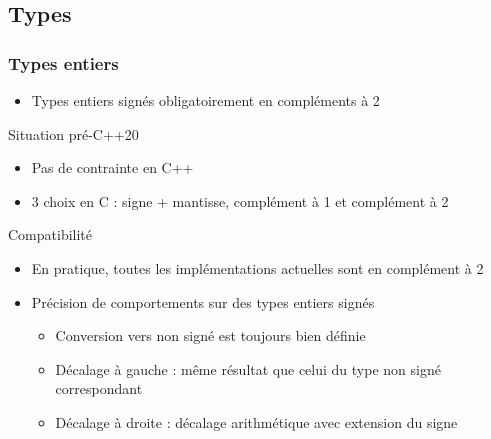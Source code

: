 \documentclass[C++.tex]{subfiles}
\begin{document}
\subsection*{Types}
\begin{frame}[fragile]
	\frametitle{Types entiers}
	\begin{itemize}
		\item Types entiers signés obligatoirement en compléments à 2
	\end{itemize}

	\begin{block}{Situation pré-C++20}
		\begin{itemize}
			\item Pas de contrainte en C++
			\item 3 choix en C : signe + mantisse, complément à 1 et complément à 2
		\end{itemize}
	\end{block}


	\begin{alertblock}{Compatibilité}
		\begin{itemize}
			\item En pratique, toutes les implémentations actuelles sont en complément à 2
		\end{itemize}
	\end{alertblock}

	\begin{itemize}
		\item Précision de comportements sur des types entiers signés
		\begin{itemize}
			\item Conversion vers non signé est toujours bien définie


			\item Décalage à gauche : même résultat que celui du type non signé correspondant
			\item Décalage à droite : décalage arithmétique avec extension du signe
		\end{itemize}
	\end{itemize}
\end{frame}
\end{document}
